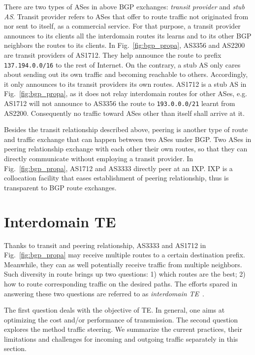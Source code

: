 There are two types of ASes in above BGP exchanges: \textit{transit provider} and \textit{stub AS}.
Transit provider refers to ASes that offer to route traffic not originated from nor sent to itself, as a commercial service.
For that purpose, a transit provider announces to its clients all the interdomain routes its learns and to its other BGP neighbors the routes to its clients.
In Fig.~\ref{fig:bgp_propa}, AS3356 and AS2200 are transit providers of AS1712. They help announce the route to prefix \texttt{137.194.0.0/16}
to the rest of Internet.
On the contrary, a stub AS only cares about sending out its own traffic and becoming reachable to others.
Accordingly, it only announces to its transit providers its own routes. AS1712 is a stub AS in Fig.~\ref{fig:bgp_propa}, as it does not relay interdomain routes for other ASes, e.g. AS1712 will not announce to AS3356 the route to \texttt{193.0.0.0/21} learnt from AS2200. Consequently no traffic toward ASes other than itself shall arrive at it.

Besides the transit relationship described above, peering is another type of route and traffic exchange that can happen between two ASes under BGP. Two ASes in peering relationship exchange with each other their own routes, so that they can directly communicate without employing a transit provider.
In Fig.~\ref{fig:bgp_propa}, AS1712 and AS3333 directly peer at an \ac{IXP}.
\ac{IXP} is a collocation facility that eases establishment of peering relationship, thus is transparent to BGP route exchanges.

\section{Interdomain TE}
Thanks to transit and peering relationship, AS3333 and AS1712 in Fig.~\ref{fig:bgp_propa} may receive multiple routes to a certain destination prefix. Meanwhile, they can as well potentially receive traffic from multiple neighbors.
Such diversity in route brings up two questions: 1) which routes are the best; 2) how to route corresponding traffic on the desired paths.
The efforts spared in answering these two questions are referred to as \textit{interdomain \ac{TE}}~\cite{Quoitin2004a,Quoitin2003,Feamster2003}.

The first question deals with the objective of \ac{TE}. In general, one aims at optimizing the cost and/or performance of transmission.
The second question explores the method traffic steering.
We summarize the current practices, their limitations and challenges for incoming and outgoing traffic separately in this section.

